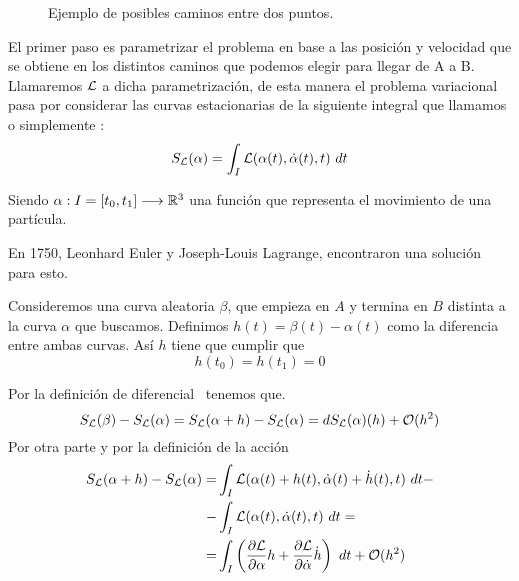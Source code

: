 \begin{figure*}[H]
	\centering
	\caption{Ejemplo de posibles caminos entre dos puntos.}
\end{figure*}

El primer paso es parametrizar el problema en base a las posición y velocidad que se obtiene en los distintos caminos que podemos elegir para llegar de A a B\@. Llamaremos $\mathcal{L}$ a dicha parametrización, de esta manera el problema variacional pasa por considerar las curvas estacionarias de la siguiente integral que llamamos  o simplemente :
\begin{equation}
	\label{eq:accion}
	S_{\mathcal{L}}(\alpha) = \int_{I}\mathcal{L}(\alpha(t), \dot{\alpha}(t), t)\ dt
\end{equation}

Siendo $\alpha:I=[t_0, t_1]\longrightarrow \mathbb{R}^3$ una función que representa el movimiento de una partícula.

En 1750, Leonhard Euler y Joseph-Louis Lagrange, encontraron una solución para esto.

Consideremos una curva aleatoria $\beta$, que empieza en $A$ y termina en $B$ distinta a la curva $\alpha$ que buscamos. Definimos $h(t) = \beta(t)-\alpha(t)$ como la diferencia entre ambas curvas. Así $h$ tiene que cumplir que
\begin{equation}
	\label{eq:extremos_h}
	h(t_0)=h(t_1)=0
\end{equation}

Por la definición de diferencial~\cite{FV} tenemos que.
\begin{equation*}
	S_{\mathcal{L}}(\beta) -  S_{\mathcal{L}}(\alpha) = S_{\mathcal{L}}(\alpha + h) -  S_{\mathcal{L}}(\alpha) = dS_{\mathcal{L}}(\alpha)(h) +\mathcal{O}(h^2)
\end{equation*}
Por otra parte y por la definición de la acción
\begin{equation*}
	\begin{split}
		S_{\mathcal{L}}(\alpha + h) -  S_{\mathcal{L}}(\alpha) = & \int_{I}\mathcal{L}(\alpha(t)+h(t), \dot{\alpha}(t)+\dot{h}(t), t)\ dt - \\
		- & \int_{I}\mathcal{L}(\alpha(t), \dot{\alpha}(t), t)\ dt =\\
		=& \int_{I}\left( \frac{\partial \mathcal{L}}{\partial\alpha}h+\frac{\partial \mathcal{L}}{\partial\dot{\alpha}}\dot{h}\right)\ dt+\mathcal{O}(h^2)
	\end{split}
\end{equation*}

